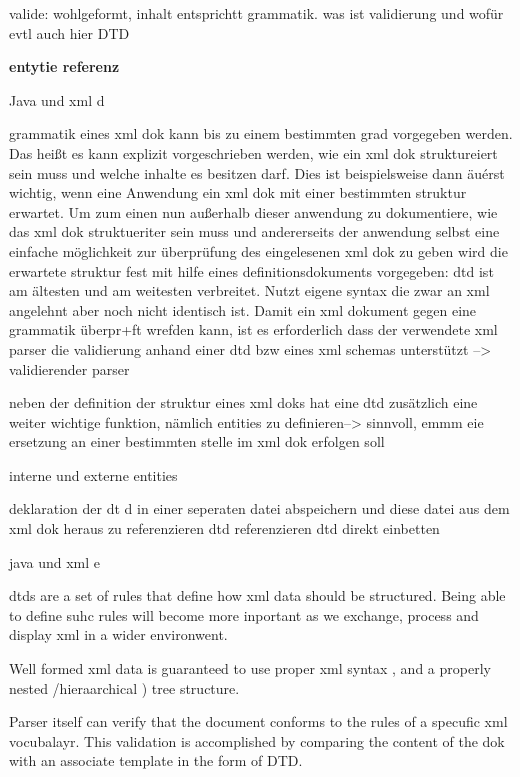 valide: wohlgeformt, inhalt entsprichtt grammatik.
was ist validierung und wofür evtl auch hier 
DTD

\textbf{entytie referenz}

Java und xml d

grammatik eines xml dok kann bis zu einem bestimmten grad vorgegeben werden. Das heißt es kann explizit vorgeschrieben werden, wie ein xml dok struktureiert sein muss und welche inhalte es besitzen darf. Dies ist beispielsweise dann äuérst wichtig, wenn eine Anwendung ein xml dok mit einer bestimmten struktur erwartet. Um zum einen nun außerhalb dieser anwendung zu dokumentiere, wie das xml dok struktueriter sein muss und andererseits der anwendung selbst eine einfache möglichkeit zur überprüfung des  eingelesenen xml dok zu geben wird die erwartete struktur fest mit hilfe eines definitionsdokuments vorgegeben: 
dtd ist am ältesten und am weitesten verbreitet. Nutzt eigene syntax die zwar an xml angelehnt aber noch nicht identisch ist. Damit ein xml dokument gegen eine grammatik überpr+ft wrefden kann, ist es erforderlich dass der verwendete xml parser die validierung anhand einer dtd bzw eines xml schemas unterstützt –> validierender parser

neben der definition der struktur eines xml doks hat eine dtd zusätzlich eine weiter wichtige funktion, nämlich entities zu definieren--> sinnvoll, emmm eie ersetzung an einer bestimmten stelle im xml dok erfolgen soll

interne und externe entities

deklaration der dt d in einer seperaten datei abspeichern und diese datei aus dem xml dok heraus zu referenzieren dtd referenzieren dtd direkt einbetten


java und xml e

dtds are a set of rules that define how xml data should be structured. Being able to define suhc rules will become more inportant as we exchange, process and display xml in a wider environwent.

Well formed xml data is guaranteed to use proper xml syntax , and a properly nested /hieraarchical ) tree structure.

Parser itself can verify that the document conforms to the rules of a specufic xml vocubalayr. This validation is accomplished by comparing the content of the dok with an associate template in the form of DTD.
 
